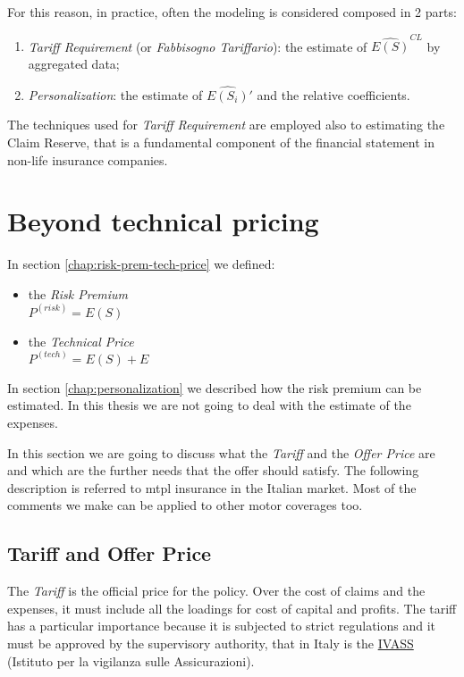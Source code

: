 \documentclass[a4paper, twoside, openright, 12pt]{report}
\providecommand{\tightlist}{%
  \setlength{\itemsep}{0pt}\setlength{\parskip}{0pt}}
\theoremstyle{definition}
\theoremstyle{definition}
\theoremstyle{definition}
\theoremstyle{remark}
\begin{document}
For this reason, in practice, often the modeling is considered composed in 2 parts:

\begin{enumerate}
\def\labelenumi{\arabic{enumi}.}
\tightlist
\item
  \emph{Tariff Requirement} (or \emph{Fabbisogno Tariffario}): the estimate of \(\widehat{E(S)}^{CL}\) by aggregated data;
\item
  \emph{Personalization}: the estimate of \(\widehat{E(S_i)}'\) and the relative coefficients.
\end{enumerate}

The techniques used for \emph{Tariff Requirement} are employed also to estimating the Claim Reserve, that is a fundamental component of the financial statement in non-life insurance companies.

\hypertarget{beyond-technical-pricing}{%
\section{Beyond technical pricing}\label{beyond-technical-pricing}}

In section \ref{chap:risk-prem-tech-price} we defined:

\begin{itemize}
\tightlist
\item
  the \emph{Risk Premium}\\
  \(P^{(risk)} = E(S)\)
\item
  the \emph{Technical Price}\\
  \(P^{(tech)} = E(S) + E\)
\end{itemize}

In section \ref{chap:personalization} we described how the risk premium can be estimated. In this thesis we are not going to deal with the estimate of the expenses.

In this section we are going to discuss what the \emph{Tariff} and the \emph{Offer Price} are and which are the further needs that the offer should satisfy. The following description is referred to \ac{mtpl} insurance in the Italian market. Most of the comments we make can be applied to other motor coverages too.

\hypertarget{tariff-and-offer-price}{%
\subsection{Tariff and Offer Price}\label{tariff-and-offer-price}}

The \emph{Tariff} is the official price for the policy. Over the cost of claims and the expenses, it must include all the loadings for cost of capital and profits. The tariff has a particular importance because it is subjected to strict regulations and it must be approved by the supervisory authority, that in Italy is the \href{https://www.ivass.it/}{IVASS} (Istituto per la vigilanza sulle Assicurazioni).
\end{document}
